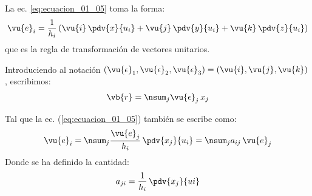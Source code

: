 La ec. \ref{eq:ecuacion_01_05} toma la forma:
\begin{align}
\vu{e}_{i} = \dfrac{1}{h_{i}} \left( \vu{i} \, \pdv{x}{u_{i}} + \vu{j} \, \pdv{y}{u_{i}} + \vu{k} \, \pdv{z}{u_{i}} \right)
\label{eq:ecuacion_01_12}
\end{align}
que es la regla de transformación de vectores unitarios.
\par
Introduciendo al notación $(\vu{\epsilon}_{1}, \vu{\epsilon}_{2}, \vu{\epsilon}_{3}) = (\vu{i}, \vu{j}, \vu{k})$, escribimos:
\begin{align*}
\vb{r} = \nsum_{j} \vu{\epsilon}_{j} \, x_{j}
\end{align*}
\par
Tal que la ec. (\ref{eq:ecuacion_01_05}) también se escribe como:
\begin{align}
\vu{e}_{i} = \nsum_{j} \dfrac{\vu{e}_{j}}{h_{i}} \, \pdv{x_{j}}{u_{i}} = \nsum_{j} a_{ij} \, \vu{e}_{j}
\label{eq:ecuacion_01_13}
\end{align}
Donde se ha definido la cantidad:
\begin{align}
a_{ji} = \dfrac{1}{h_{i}} \, \pdv{x_{j}}{u{i}}
\label{eq:ecuacion_01_14}
\end{align}

